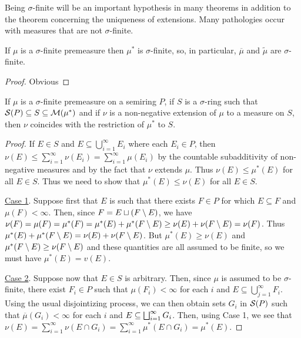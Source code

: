 Being $\sigma$-finite will be an important hypothesis in many theorems in addition to the theorem concerning the uniqueness of extensions. Many pathologies occur with measures that are not $\sigma$-finite.

\begin{proposition}
If $\mu$ is a $\sigma$-finite premeasure then $\mu^*$ is $\sigma$-finite, so, in particular, $\overline{\mu}$ and $\widetilde{\mu}$ are $\sigma$-finite.
\end{proposition}
\begin{proof}
Obvious
\end{proof}

\begin{theorem}\label{thm:unique extension}
If $\mu$ is a $\sigma$-finite premeasure on a semiring $P$, if $S$ is a $\sigma$-ring such that ${\cal S}(P)\subseteq S\subseteq{\cal M}(\mu^*)$ and if $\nu$ is a non-negative extension of $\mu$ to a measure on $S$, then $\nu$ coincides with the restriction of $\mu^*$ to $S$.
\end{theorem}

\begin{proof}
If $E\in S$ and $E\subseteq\bigcup_{i=1}^\infty E_i$ where each $E_i\in P$, then $\nu(E)\leq\sum_{i=1}^\infty\nu(E_i)=\sum_{i=1}^\infty\mu(E_i)$ by the countable subadditivity of non-negative measures and by the fact that $\nu$ extends $\mu$. Thus $\nu(E)\leq\mu^*(E)$ for all $E\in S$. Thus we need to show that $\mu^*(E)\leq\nu(E)$ for all $E\in S$.

\underline{Case 1}. Suppose first that $E$ is such that there exists $F\in P$ for which $E\subseteq F$ and $\mu(F)<\infty$. Then, since $F=E\sqcup(F\setminus E)$, we have $\nu(F)=\mu(F)=\mu^*(F)=\mu^*(E)+\mu^*(F\setminus E)\geq\nu(E)+\nu(F\setminus E)=\nu(F)$. Thus $\mu^*(E)+\mu^*(F\setminus E)=\nu(E)+\nu(F\setminus E)$. But $\mu^*(E)\geq\nu(E)$ and $\mu^*(F\setminus E)\geq\nu(F\setminus E)$ and these quantities are all assumed to be finite, so we must have $\mu^*(E)=v(E)$.

\underline{Case 2}. Suppose now that $E\in S$ is arbitrary. Then, since $\mu$ is assumed to be $\sigma$-finite, there exist $F_i\in P$ such that $\mu(F_i)<\infty$ for each $i$ and $E\subseteq\bigcup_{j=1}^\infty F_i$. Using the usual disjointizing process, we can then obtain sets $G_i$ in ${\cal S}(P)$ such that $\overline{\mu}(G_i)<\infty$ for each $i$ and $E\subseteq\bigsqcup_{i=1}^\infty G_i$. Then, using Case 1, we see that $\nu(E)=\sum_{i=1}^\infty\nu(E\cap G_i)=\sum_{i=1}^\infty\mu^*(E\cap G_i)=\mu^*(E)$.
\end{proof}

